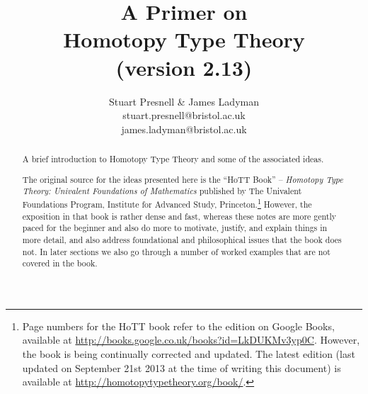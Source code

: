 \documentclass[12pt, a4paper]{article}
\author{Stuart Presnell \& James Ladyman
\\stuart.presnell@bristol.ac.uk
\\james.ladyman@bristol.ac.uk
}
\title{A Primer on \\Homotopy Type Theory
\\ (version 2.13)
}
\begin{document}
\maketitle
\begin{abstract}
A brief introduction to Homotopy Type Theory and some of the associated ideas.

The original source for the ideas presented here is the ``HoTT Book'' -- \emph{Homotopy Type Theory: Univalent Foundations of Mathematics} published by The Univalent Foundations Program, Institute for Advanced Study, Princeton.\footnote{
Page numbers for the HoTT book refer to the edition on Google Books, available at 
\href{http://books.google.co.uk/books?id=LkDUKMv3yp0C}{http://books.google.co.uk/books?id=LkDUKMv3yp0C}.
However, the book is being continually corrected and updated.  The latest edition (last updated on September 21st 2013 at the time of writing this document) is available at 
\href{http://homotopytypetheory.org/book/}{http://homotopytypetheory.org/book/}.
}  
However, the exposition in that book is rather dense and fast, whereas these notes are more gently paced for the beginner and also do more to motivate, justify, and explain things in more detail, and also address foundational and philosophical issues that the book does not.  In later sections we also go through a number of worked examples that are not covered in the book.
\end{abstract}

\newpage
\setcounter{tocdepth}{2}
\tableofcontents

\newpage






%


%

%

% 

%

% 

% 
\end{document}
